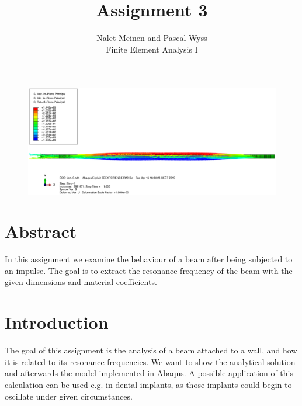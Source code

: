 \documentclass[12pt]{article}
\begin{document}


\title{Assignment 3}%
\author{Nalet Meinen and Pascal Wyss\\ %
Finite Element Analysis I
}


 


\maketitle


\begin{figure}[!htb]
  \centering
  \vspace*{6cm}
  \includegraphics[trim={1cm 4cm 1cm 10cm},clip,width=1.0\linewidth]{pics/title}
\end{figure}

  \pagebreak

\section*{Abstract}
In this assignment we examine the behaviour of a beam after being subjected to an impulse.
The goal is to extract the resonance frequency of the beam with the given dimensions and material coefficients.



\tableofcontents
\pagebreak
\section{Introduction}
The goal of this assignment is the analysis of a beam attached to a wall, 
and how it is related to its resonance frequencies. We want to show the analytical 
solution and afterwards the model implemented in Abaqus. A possible application
of this calculation can be used e.g. in dental implants, 
as those implants could begin to oscillate under given circumstances.
\end{document}
